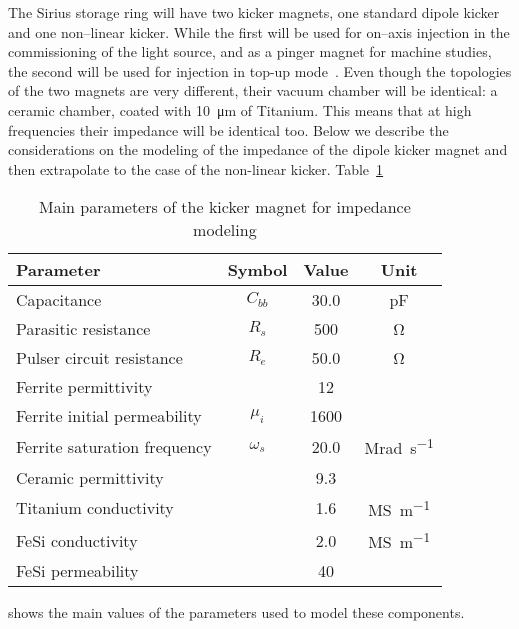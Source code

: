     The Sirius storage ring will have two kicker magnets, one standard dipole kicker and one non--linear kicker. While the first will be used for on--axis injection in the commissioning of the light source, and as a pinger magnet for machine studies, the second will be used for injection in top-up mode~\cite{Liu2016a}. Even though the topologies of the two magnets are very different, their vacuum chamber will be identical: a ceramic chamber, coated with \SI{10}{\micro\meter} of Titanium. This means that at high frequencies their impedance will be identical too. Below we describe the considerations on the modeling of the impedance of the dipole kicker magnet and then extrapolate to the case of the non-linear kicker. Table~\ref{tab:kicker_paramters}
    \begin{table}
        \centering
        \caption{Main parameters of the kicker magnet for impedance modeling}
        \label{tab:kicker_paramters}
        \begin{tabular}{lccc}
            \toprule
            Parameter                     & Symbol    & Value  & Unit \\
            \midrule
            Capacitance                   & $C_{bb}$  &  30.0  & \si{\pico\farad}\\
            Parasitic resistance          & $R_s$     &  500   & \si{\ohm}\\
            Pulser circuit resistance     & $R_e$     &  50.0  & \si{\ohm}\\
            Ferrite permittivity          &           &   12   & \\
            Ferrite initial permeability  & $\mu_i$   &  1600  & \\
            Ferrite saturation frequency  & $\omega_s$&  20.0  & \si{\mega\radian\per\second}\\
            Ceramic permittivity          &           &  9.3   & \\
            Titanium conductivity         &           &  1.6   & \si{\mega\siemens\per\meter}\\
            FeSi conductivity             &           &  2.0   & \si{\mega\siemens\per\meter}\\
            FeSi permeability             &           & 40     & \\
            \bottomrule
        \end{tabular}
    \end{table}
    shows the main values of the parameters used to model these components.

